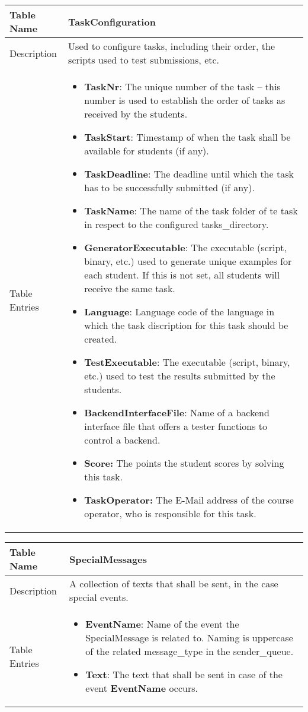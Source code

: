 \begin{tabular}{|p{3cm}|p{10cm}|}
\hline
Table Name & TaskConfiguration \\
\hline
Description & Used to configure tasks, including their order, the scripts used to test
    submissions, etc.\\
\hline
Table Entries & \begin{itemize}
    \item {\bf TaskNr}: The unique number of the task -- this number is used to establish
        the order of tasks as received by the students.
    \item {\bf TaskStart}: Timestamp of when the task shall be available for students
        (if any).
    \item {\bf TaskDeadline}: The deadline until which the task has to be successfully
        submitted (if any).
    \item {\bf TaskName}: The name of the task folder of te task in respect to the
    configured tasks\_directory.
    \item {\bf GeneratorExecutable}: The executable (script, binary, etc.) used to
        generate unique examples for each student. If this is not set, all students will
        receive the same task.
    \item {\bf Language}: Language code of the language in which the task discription for
        this task should be created.
    \item {\bf TestExecutable}: The executable (script, binary, etc.) used to test the
        results submitted by the students.
    \item {\bf BackendInterfaceFile}: Name of a backend interface file that offers a tester functions to control a backend.
    \item {\bf Score:} The points the student scores by solving this task.
    \item {\bf TaskOperator:} The E-Mail address of the course operator, who is
        responsible for this task.
    \end{itemize}

\\
\hline
\end{tabular}

\begin{tabular}{|p{2.5cm}|p{11cm}|}
\hline
Table Name & SpecialMessages \\
\hline
Description & A collection of texts that shall be sent, in the case special events. \\
\hline
Table Entries & \begin{itemize}
    \item {\bf EventName}: Name of the event the SpecialMessage is related to. Naming is
        uppercase of the related message\_type in the sender\_queue.
    \item {\bf Text}: The text that shall be sent in case of the event {\bf EventName}
        occurs.
    \end{itemize} \\
\hline
\end{tabular}

